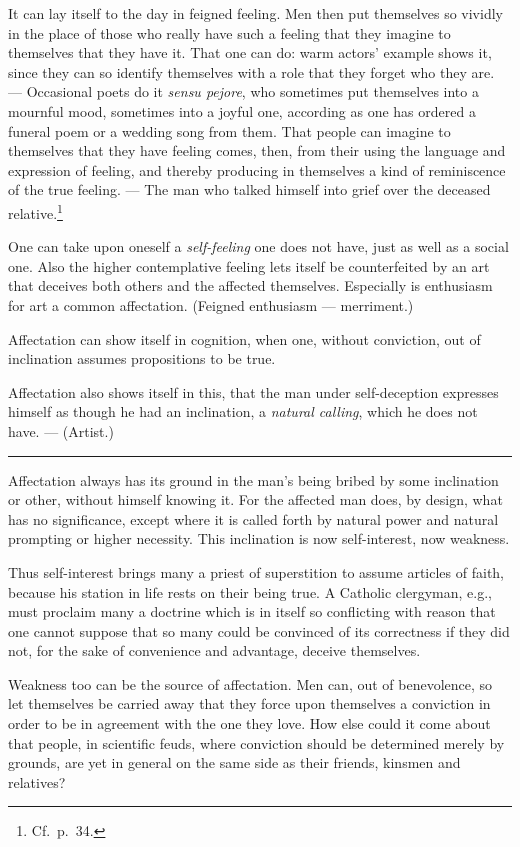 \documentclass[12pt]{article}
\newcommand{\opage}[1]{\marginnote{\footnotesize\textit{[#1]}}}
\newcommand{\ombreak}{\par\medskip\begin{center}\rule{0.32\textwidth}{0.4pt}\end{center}\medskip}
\begin{document}
It can lay itself to the day in feigned feeling. Men then put themselves so vividly in the place of those who really have such a feeling that they imagine to themselves that they have it. That one can do: warm actors' example shows it, since they can so identify themselves with a role that they forget who they are. --- Occasional poets do it \emph{sensu pejore}, who sometimes put themselves into a mournful mood, sometimes into a joyful one, according as one has ordered a funeral poem or a wedding song from them. That people can imagine to themselves that they have feeling comes, then, from their using the language and expression of feeling, and thereby producing in themselves a kind of reminiscence of the true feeling. --- The man who talked himself into grief over the deceased relative.\footnote{Cf.\ p.\ 34.}

\opage{174}One can take upon oneself a \emph{self-feeling} one does not have, just as well as a social one. Also the higher contemplative feeling lets itself be counterfeited by an art that deceives both others and the affected themselves. Especially is enthusiasm for art a common affectation. (Feigned enthusiasm --- merriment.)

Affectation can show itself in cognition, when one, without conviction, out of inclination assumes propositions to be true.

Affectation also shows itself in this, that the man under self-deception expresses himself as though he had an inclination, a \emph{natural calling}, which he does not have. --- (Artist.)

\ombreak

Affectation always has its ground in the man's being bribed by some inclination or other, without himself knowing it. For the affected man does, by design, what has no significance, except where it is called forth by natural power and natural prompting or higher necessity. This inclination is now self-interest, now weakness.

Thus self-interest brings many a priest of superstition to assume articles of faith, because his station in life rests on their being true. A Catholic clergyman, e.g., must proclaim many a doctrine which is in itself so conflicting with reason that one cannot suppose that so many could be convinced of its correctness if they did not, for the sake of convenience and advantage, deceive themselves.

Weakness too can be the source of affectation. Men can, out of benevolence, so let themselves be carried away that they force upon themselves a conviction in order to be in agreement with the one they love. How else could it come about that people, in scientific feuds, where conviction should be determined merely by grounds, are yet in general on the same side as their friends, kinsmen and relatives?
\end{document}
